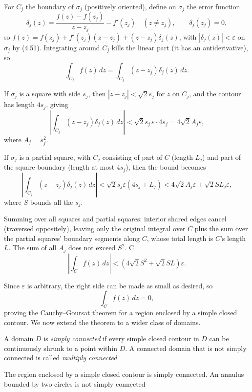 \documentclass{article}
\begin{document}
\bigskip

For $C_j$ the boundary of $\sigma_j$ (positively oriented), define on $\sigma_j$ the error function
\[
\delta_j(z) = \frac{f(z)-f(z_j)}{z-z_j} - f'(z_j) \quad (z\ne z_j), \qquad \delta_j(z_j)=0,
\]
so $f(z) = f(z_j) + f'(z_j)(z-z_j) + (z-z_j)\delta_j(z)$, with $|\delta_j(z)| < \varepsilon$ on $\sigma_j$ by (4.51). Integrating around $C_j$ kills the linear part (it has an antiderivative), so
\[
\int_{C_j} f(z)\,dz = \int_{C_j} (z-z_j)\delta_j(z)\,dz.
\]

If $\sigma_j$ is a square with side $s_j$, then $|z-z_j|<\sqrt{2}s_j$ for $z$ on $C_j$, and the contour has length $4s_j$, giving
\[
\left|\int_{C_j}(z-z_j)\delta_j(z)\,dz\right| < \sqrt{2}s_j\,\varepsilon\cdot 4s_j = 4\sqrt{2}A_j\varepsilon, \tag{4.59}
\]
where $A_j=s_j^2$.

If $\sigma_j$ is a partial square, with $C_j$ consisting of part of $C$ (length $L_j$) and part of the square boundary (length at most $4s_j$), then the bound becomes
\[
\left|\int_{C_j}(z-z_j)\delta_j(z)\,dz\right| < \sqrt{2}s_j\varepsilon(4s_j+L_j) < 4\sqrt{2}A_j\varepsilon + \sqrt{2}SL_j\varepsilon, 
\]
where $S$ bounds all the $s_j$.

Summing over all squares and partial squares: interior shared edges cancel (traversed oppositely), leaving only the original integral over $C$ plus the sum over the partial squares' boundary segments along $C$, whose total length is $C$'s length $L$. The sum of all $A_j$ does not exceed $S^2$. C
\[
\left|\int_C f(z)\,dz\right| < (4\sqrt{2}S^2 + \sqrt{2}SL)\varepsilon.
\]

Since $\varepsilon$ is arbitrary, the right side can be made as small as desired, so
\[
\int_C f(z)\,dz = 0,
\]
proving the Cauchy--Goursat theorem for a region enclosed by a simple closed contour. We now extend the theorem to a wider class of domains.

\begin{definition}
A domain $D$ is \emph{simply connected} if every simple closed contour in $D$ can be continuously shrunk to a point within $D$. A connected domain that is not simply connected is called \emph{multiply connected}.
\end{definition}

\begin{example}
The region enclosed by a simple closed contour is simply connected. An annulus bounded by two circles is not simply connected 
\end{example}
\end{document}
